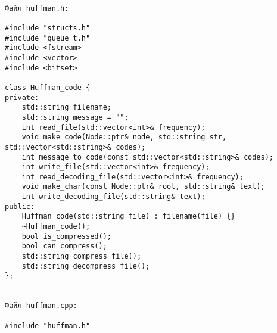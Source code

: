 \begin{verbatim}

Файл huffman.h:

#include "structs.h"
#include "queue_t.h"
#include <fstream>
#include <vector>
#include <bitset>

class Huffman_code {
private:
    std::string filename;
    std::string message = "";
    int read_file(std::vector<int>& frequency);
    void make_code(Node::ptr& node, std::string str, std::vector<std::string>& codes);
    int message_to_code(const std::vector<std::string>& codes);
    int write_file(std::vector<int>& frequency);
    int read_decoding_file(std::vector<int>& frequency);
    void make_char(const Node::ptr& root, std::string& text);
    int write_decoding_file(std::string& text);
public:
    Huffman_code(std::string file) : filename(file) {}
    ~Huffman_code();
    bool is_compressed();
    bool can_compress();
    std::string compress_file();
    std::string decompress_file();
};


Файл huffman.cpp:

#include "huffman.h"


\end{verbatim}
